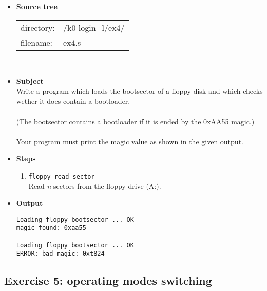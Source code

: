 \begin{itemize}
\item {\bf Source tree}\\
\begin{tabular}{p{4cm}l}
directory: & /k0-login\_l/ex4/\\
filename: & ex4.s
\end{tabular}
\\
\item {\bf Subject}\\
Write a program which loads the bootsector of a floppy disk and which checks wether it does contain a bootloader.\\
\\
(The bootsector contains a bootloader if it is ended by the 0xAA55 magic.)\\
\\
Your program must print the magic value as shown in the given output.\\
\item {\bf Steps}
  \begin{enumerate}
  \item {\tt floppy\_read\_sector}\\
  Read {\em n} sectors from the floppy drive (A:).
  \\
  \end{enumerate}
\item {\bf Output}
\begin{verbatim}
Loading floppy bootsector ... OK
magic found: 0xaa55

Loading floppy bootsector ... OK
ERROR: bad magic: 0xt824
\end{verbatim}
\end{itemize}

\newpage

\subsection*{Exercise 5: operating modes switching}

